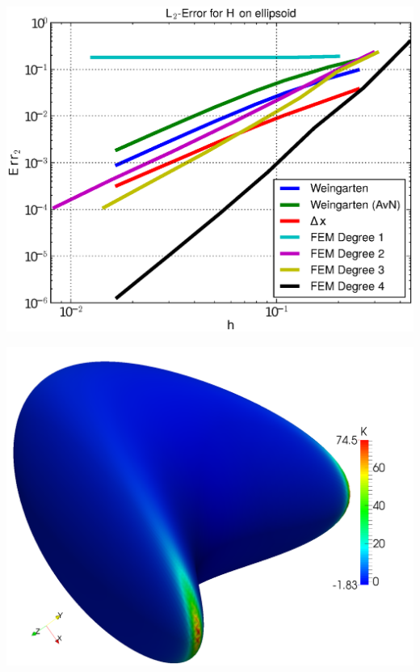 \documentclass[handout]{beamer}
\begin{document}
\begin{frame}
\begin{overprint}
\begin{minipage}[t]{0.49\textwidth}
            \centering\includegraphics[width=\textwidth]{bilder/Curvature/heineC/ErrHL2_7.eps}
          \end{minipage}
          \begin{minipage}[t]{0.49\textwidth}
              \centering\includegraphics[width=\textwidth]{bilder/Curvature/heineB/K250k.png}
          \end{minipage}\hfill
          \begin{minipage}[t]{0.49\textwidth}

\end{minipage}
\end{overprint}
\end{frame}
\end{document}
